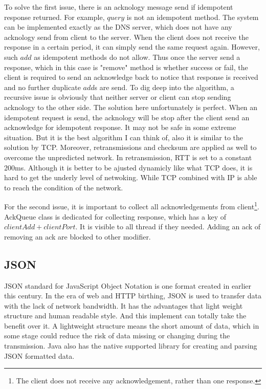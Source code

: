 \documentclass[11pt]{article}
\begin{document}
To solve the first issue, there is an acknology message send if idempotent response returned. For example, $query$ is not an idempotent method. The system can be implemented exactly as the DNS server, which does not have any acknology send from client to the server. When the client does not receive the response in a certain period, it can simply send the same request again. However, such $add$ as idempotent methods do not allow. Thus once the server send a response, which in this case is "remove" method is whether success or fail, the client is required to send an acknowledge back to notice that response is received and no further duplicate $add$s are send. To dig deep into the algorithm, a recursive issue is obviously that neither server or client can stop sending acknology to the other side. The solution here unfortunately is perfect. When an idempotent request is send, the acknology will be stop after the client send an acknowledge for idempotent response. It may not be safe in some extreme situation. But it is the best algorithm I can think of, also it is similar to the solution by TCP. Moreover, retransmissions and checksum are applied as well to overcome the unpredicted network. In retransmission, RTT is set to a constant 200ms. Although it is better to be ajusted dynamicly like what TCP does, it is hard to get the underly level of netwoking. While TCP combined with IP is able to reach the condition of the network. 

For the second issue, it is important to collect all acknowledgements from client\footnote{The client does not receive any acknowledgement, rather than one response.}. AckQueue class is dedicated for collecting response, which has a key of $clientAdd+clientPort$. It is visible to all thread if they needed. Adding an ack of removing an ack are blocked to other modifier.

\subsection{JSON}
JSON standard for JavaScript Object Notation is one format created in earlier this century. In the era of web and HTTP birthing, JSON is used to transfer data with the lack of network bandwidth. It has the advantages that light weight structure and human readable style. And this implement can totally take the benefit over it. A lightweight structure means the short amount of data, which in some stage could reduce the risk of data missing or changing during the transmission. Java also has the native supported library for creating and parsing JSON formatted data.
\end{document}
